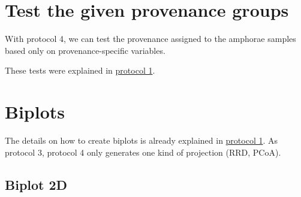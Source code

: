 \documentclass[12pt,]{book}
\newenvironment{Shaded}{\begin{snugshade}}{\end{snugshade}}
\newcommand{\CommentTok}[1]{\textcolor[rgb]{0.56,0.35,0.01}{\textit{#1}}}
\newcommand{\KeywordTok}[1]{\textcolor[rgb]{0.13,0.29,0.53}{\textbf{#1}}}
\newcommand{\NormalTok}[1]{#1}
\newcommand{\OperatorTok}[1]{\textcolor[rgb]{0.81,0.36,0.00}{\textbf{#1}}}
\newcommand{\StringTok}[1]{\textcolor[rgb]{0.31,0.60,0.02}{#1}}
\begin{document}
\hypertarget{test-the-given-provenance-groups-1}{%
\section{Test the given provenance groups}\label{test-the-given-provenance-groups-1}}

With protocol 4, we can test the provenance assigned to the amphorae samples based only on provenance-specific variables.

\begin{Shaded}
\end{Shaded}

These tests were explained in \protect\hyperlink{tests}{protocol 1}.

\pagebreak

\hypertarget{biplots-2}{%
\section{Biplots}\label{biplots-2}}

The details on how to create biplots is already explained in \protect\hyperlink{biplot}{protocol 1}. As protocol 3, protocol 4 only generates one kind of projection (RRD, PCoA).

\hypertarget{biplot-2d-3}{%
\subsection{Biplot 2D}\label{biplot-2d-3}}
\end{document}
